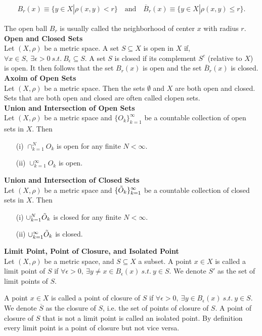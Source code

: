 \documentclass{article}
\numberwithin{theorem}{subsection}
\numberwithin{theorem}{subsubsection}
\theoremstyle{definition}
\numberwithin{definition}{subsection}
\numberwithin{definition}{subsubsection}
\begin{document}
\begin{gather*}
    B_{r} (x) \equiv \{y \in X | \rho (x,y) < r\} \quad \text{and} \quad \overline{B}_{r} (x) \equiv \{y \in X | \rho (x,y) \leq r\}.
\end{gather*}

\noindent The open ball $B_{r}$ is usually called the neighborhood of center $x$ with radius $r$.
\\

\noindent \textbf{Open and Closed Sets} \\
\indent Let $(X, \rho)$ be a metric space. A set $S \subseteq X$ is open in $X$ if, $\forall x \in S,\ \exists \epsilon > 0\ s.t.\ B_{\epsilon} \subseteq S$. A set $S$ is closed if its complement $S^{c}$ (relative to $X$) is open. It then follows that the set $B_{r}(x)$ is open and the set $\overline{B}_{r}(x)$ is closed.
\\

\noindent \textbf{Axoim of Open Sets} \\
\indent Let $(X, \rho)$ be a metric space. Then the sets $\emptyset$ and $X$ are both open and closed. Sets that are both open and closed are often called clopen sets.
\\

\noindent \textbf{Union and Intersection of Open Sets} \\
\indent Let $(X, \rho)$ be a metric space and $\{O_{k}\}_{k=1}^{\infty}$ be a countable collection of open sets in $X$. Then

\begin{itemize}
    \item[(i)] $\cap_{k=1}^{N} O_{k}$ is open for any finite $N < \infty$.
    \item[(ii)] $\cup_{k=1}^{\infty} O_{k}$ is open.
\end{itemize}

\noindent \textbf{Union and Intersection of Closed Sets} \\
\indent Let $(X, \rho)$ be a metric space and $\{\Tilde{O}_{k}\}_{k=1}^{\infty}$ be a countable collection of closed sets in $X$. Then

\begin{itemize}
    \item[(i)] $\cup_{k=1}^{N} \Tilde{O}_{k}$ is closed for any finite $N < \infty$.
    \item[(ii)] $\cup_{k=1}^{\infty} \Tilde{O}_{k}$ is closed.
\end{itemize}

\noindent \textbf{Limit Point, Point of Closure, and Isolated Point} \\
\indent Let $(X,\rho)$ be a metric space, and $S \subseteq X$ a subset. A point $x \in X$ is called a limit point of $S$ if $\forall \epsilon > 0,\ \exists y \neq x \in B_{\epsilon} (x)\ s.t.\ y \in S$. We denote $S'$ as the set of limit points of $S$. \par
A point $x \in X$ is called a point of closure of $S$ if $\forall \epsilon > 0,\ \exists y \in B_{\epsilon}(x)\ s.t.\ y \in S$. We denote $\overline{S}$ as the closure of $S$, i.e. the set of points of closure of $S$. A point of closure of $S$ that is not a limit point is called an isolated point. By definition every limit point is a point of closure but not vice versa.
\end{document}
